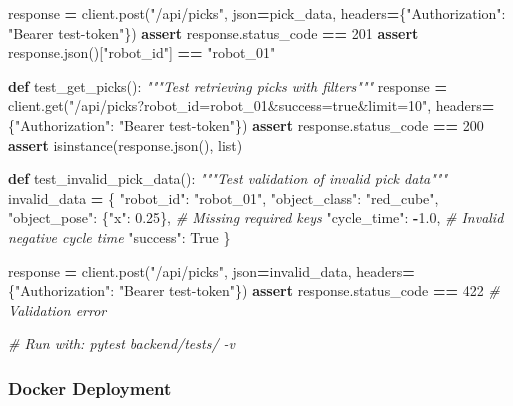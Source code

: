 \documentclass[
]{article}
\newenvironment{Shaded}{\begin{snugshade}}{\end{snugshade}}
\newcommand{\BuiltInTok}[1]{#1}
\newcommand{\CommentTok}[1]{\textcolor[rgb]{0.56,0.35,0.01}{\textit{#1}}}
\newcommand{\ControlFlowTok}[1]{\textcolor[rgb]{0.13,0.29,0.53}{\textbf{#1}}}
\newcommand{\DecValTok}[1]{\textcolor[rgb]{0.00,0.00,0.81}{#1}}
\newcommand{\FloatTok}[1]{\textcolor[rgb]{0.00,0.00,0.81}{#1}}
\newcommand{\KeywordTok}[1]{\textcolor[rgb]{0.13,0.29,0.53}{\textbf{#1}}}
\newcommand{\NormalTok}[1]{#1}
\newcommand{\OperatorTok}[1]{\textcolor[rgb]{0.81,0.36,0.00}{\textbf{#1}}}
\newcommand{\StringTok}[1]{\textcolor[rgb]{0.31,0.60,0.02}{#1}}
\newcommand{\VariableTok}[1]{\textcolor[rgb]{0.00,0.00,0.00}{#1}}
\begin{document}
\begin{Shaded}
\begin{Highlighting}[]
\NormalTok{    response }\OperatorTok{=}\NormalTok{ client.post(}\StringTok{"/api/picks"}\NormalTok{, json}\OperatorTok{=}\NormalTok{pick\_data, headers}\OperatorTok{=}\NormalTok{\{}\StringTok{"Authorization"}\NormalTok{: }\StringTok{"Bearer test{-}token"}\NormalTok{\})}
    \ControlFlowTok{assert}\NormalTok{ response.status\_code }\OperatorTok{==} \DecValTok{201}
    \ControlFlowTok{assert}\NormalTok{ response.json()[}\StringTok{"robot\_id"}\NormalTok{] }\OperatorTok{==} \StringTok{"robot\_01"}

\KeywordTok{def}\NormalTok{ test\_get\_picks():}
    \CommentTok{"""Test retrieving picks with filters"""}
\NormalTok{    response }\OperatorTok{=}\NormalTok{ client.get(}\StringTok{"/api/picks?robot\_id=robot\_01\&success=true\&limit=10"}\NormalTok{, headers}\OperatorTok{=}\NormalTok{\{}\StringTok{"Authorization"}\NormalTok{: }\StringTok{"Bearer test{-}token"}\NormalTok{\})}
    \ControlFlowTok{assert}\NormalTok{ response.status\_code }\OperatorTok{==} \DecValTok{200}
    \ControlFlowTok{assert} \BuiltInTok{isinstance}\NormalTok{(response.json(), }\BuiltInTok{list}\NormalTok{)}

\KeywordTok{def}\NormalTok{ test\_invalid\_pick\_data():}
    \CommentTok{"""Test validation of invalid pick data"""}
\NormalTok{    invalid\_data }\OperatorTok{=}\NormalTok{ \{}
        \StringTok{"robot\_id"}\NormalTok{: }\StringTok{"robot\_01"}\NormalTok{,}
        \StringTok{"object\_class"}\NormalTok{: }\StringTok{"red\_cube"}\NormalTok{,}
        \StringTok{"object\_pose"}\NormalTok{: \{}\StringTok{"x"}\NormalTok{: }\FloatTok{0.25}\NormalTok{\},  }\CommentTok{\# Missing required keys}
        \StringTok{"cycle\_time"}\NormalTok{: }\OperatorTok{{-}}\FloatTok{1.0}\NormalTok{,  }\CommentTok{\# Invalid negative cycle time}
        \StringTok{"success"}\NormalTok{: }\VariableTok{True}
\NormalTok{    \}}

\NormalTok{    response }\OperatorTok{=}\NormalTok{ client.post(}\StringTok{"/api/picks"}\NormalTok{, json}\OperatorTok{=}\NormalTok{invalid\_data, headers}\OperatorTok{=}\NormalTok{\{}\StringTok{"Authorization"}\NormalTok{: }\StringTok{"Bearer test{-}token"}\NormalTok{\})}
    \ControlFlowTok{assert}\NormalTok{ response.status\_code }\OperatorTok{==} \DecValTok{422}  \CommentTok{\# Validation error}

\CommentTok{\# Run with: pytest backend/tests/ {-}v}
\end{Highlighting}
\end{Shaded}

\hypertarget{docker-deployment}{%
\subsubsection{Docker Deployment}\label{docker-deployment}}
\end{document}
